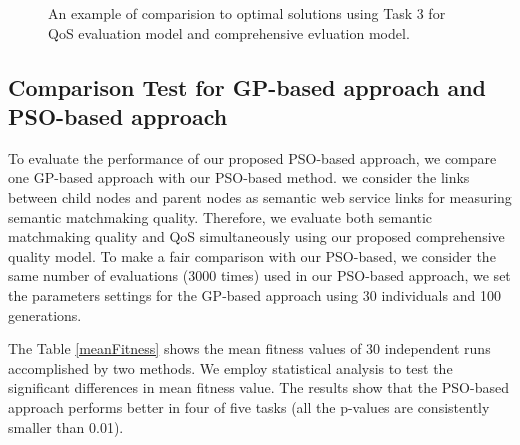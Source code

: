 \documentclass{llncs}
\begin{document}
\begin{figure}[h]
 \caption{An example of comparision to optimal solutions using Task 3 for QoS evaluation model and comprehensive evluation model.}
 \label{comparisontest}
\end{figure}

\subsection{Comparison Test for GP-based approach and PSO-based approach}\label{comparisonTestWithGP}
To evaluate the performance of our proposed PSO-based approach, we compare one GP-based approach  \cite{ma2015hybrid} with our PSO-based method. we consider the links between child nodes and parent nodes as semantic web service links for measuring  semantic matchmaking quality. Therefore, we evaluate both semantic matchmaking quality and QoS simultaneously using our proposed comprehensive quality model. To make a fair comparison with our PSO-based, we consider the same number of evaluations (3000 times) used in our PSO-based approach, we set the parameters settings for the GP-based approach using 30 individuals and 100 generations.

The Table \ref{meanFitness} shows the mean fitness values of 30 independent runs accomplished by two methods. We employ statistical analysis to test the significant differences in mean fitness value. The results show that the PSO-based approach performs better in four of five tasks (all the p-values are consistently smaller than 0.01).
\end{document}
